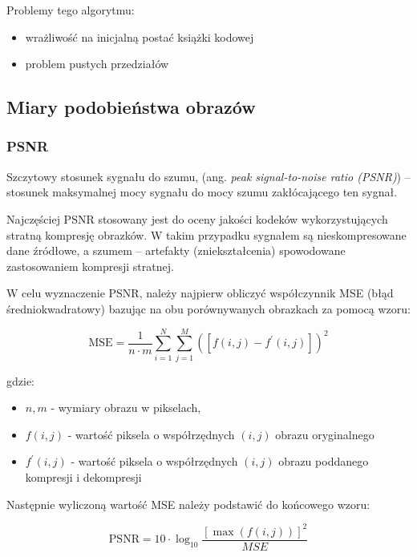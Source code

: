 \documentclass{article}
\begin{document}
Problemy tego algorytmu:

\begin{itemize}
  \item wrażliwość na inicjalną postać książki kodowej
  \item problem pustych przedziałów
\end{itemize}

\subsection{Miary podobieństwa obrazów}

\subsubsection{PSNR}

Szczytowy stosunek sygnału do szumu, (ang. \emph{peak signal-to-noise ratio (PSNR)}) – stosunek maksymalnej mocy sygnału do mocy szumu zakłócającego ten sygnał.  

Najczęściej PSNR stosowany jest do oceny jakości kodeków wykorzystujących stratną kompresję obrazków. 
W takim przypadku sygnałem są nieskompresowane dane źródłowe, a szumem – artefakty (zniekształcenia) spowodowane zastosowaniem kompresji stratnej. 

W celu wyznaczenie PSNR, należy najpierw obliczyć współczynnik MSE (błąd średniokwadratowy) bazując na obu porównywanych obrazkach za pomocą wzoru:

\begin{equation}
    \mathrm{MSE} = \frac{1}{n \cdot m} \sum_{i=1}^N \sum_{j=1}^M ([f(i, j) - f^{'}(i, j)])^2
\end{equation}

gdzie:
\begin{itemize}[label=]
  \item $n, m$ - wymiary obrazu w pikselach,
  \item $f(i, j)$ - wartość piksela o współrzędnych $(i, j)$ obrazu oryginalnego
  \item $f^{'}(i, j)$ - wartość piksela o współrzędnych $(i, j)$ obrazu poddanego kompresji i dekompresji
\end{itemize}

Następnie wyliczoną wartość MSE należy podstawić do końcowego wzoru: 

\begin{equation}
    \mathrm{PSNR} = 10 \cdot \log_{10} \frac{[\max(f(i,j))]^2}{MSE}
\end{equation}
\end{document}
